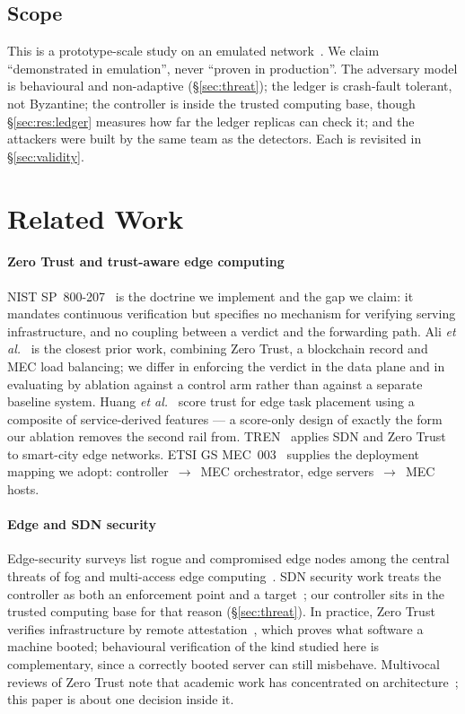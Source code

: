\documentclass[10pt,twocolumn,letterpaper]{article}
\newcommand{\etal}{\textit{et al.}}
\begin{document}
\subsection{Scope}
This is a prototype-scale study on an emulated network~\cite{lantz2010mininet}.
We claim ``demonstrated in emulation'', never ``proven in production''. The
adversary model is behavioural and non-adaptive (\S\ref{sec:threat}); the
ledger is crash-fault tolerant, not Byzantine; the controller is inside the
trusted computing base, though \S\ref{sec:res:ledger} measures how far the
ledger replicas can check it; and the attackers were built by the same team as the
detectors. Each is revisited in \S\ref{sec:validity}.

\section{Related Work}
\label{sec:related}

\paragraph*{Zero Trust and trust-aware edge computing}
NIST SP~800-207~\cite{rose2020zta} is the doctrine we implement and the gap we
claim: it mandates continuous verification but specifies no mechanism for
verifying serving infrastructure, and no coupling between a verdict and the
forwarding path. Ali \etal~\cite{ali2023ztmec} is the closest prior work,
combining Zero Trust, a blockchain record and MEC load balancing; we differ in
enforcing the verdict in the data plane and in evaluating by ablation against a
control arm rather than against a separate baseline system. Huang
\etal~\cite{huang2024trustmultitier} score trust for edge task placement using
a composite of service-derived features --- a score-only design of exactly the
form our ablation removes the second rail from.
TREN~\cite{tren2025smartcity} applies SDN and Zero Trust to smart-city edge
networks. ETSI GS MEC~003~\cite{etsi_mec003} supplies the deployment mapping we
adopt: controller~$\to$~MEC orchestrator, edge servers~$\to$~MEC hosts.

\paragraph*{Edge and SDN security}
Edge-security surveys list rogue and compromised edge nodes among the central
threats of fog and multi-access edge computing~\cite{roman2018mec,xiao2019edgesec}.
SDN security work treats the controller as both an enforcement point and a
target~\cite{kreutz2013secure,scotthayward2016sdnsec}; our controller sits in
the trusted computing base for that reason (\S\ref{sec:threat}). In practice,
Zero Trust verifies infrastructure by remote attestation~\cite{rfc9334}, which
proves what software a machine booted; behavioural verification of the kind
studied here is complementary, since a correctly booted server can still
misbehave. Multivocal reviews of Zero Trust note that academic work has
concentrated on architecture~\cite{buck2021zt}; this paper is about one
decision inside it.
\end{document}
